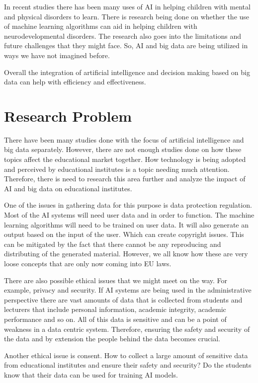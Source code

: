 \documentclass{imc-inf}
\begin{document}
In recent studies there has been many uses of AI in helping children with mental and physical disorders to learn. There is research being done on whether the use of machine learning algorithms can aid in helping children with neurodevelopmental disorders. The research also goes into the limitations and future challenges that they might face. So, AI and big data are being utilized in ways we have not imagined before. 

Overall the integration of artificial intelligence and decision making based on big data can help with efficiency and effectiveness. 

\section{Research Problem }
There have been many studies done with the focus of artificial intelligence and big data separately. However, there are not enough studies done on how these topics affect the educational market together. How technology is being adopted and perceived by educational institutes is a topic needing much attention. Therefore, there is need to research this area further and analyze the impact of AI and big data on educational institutes. 

One of the issues in gathering data for this purpose is data protection regulation. Most of the AI systems will need user data and in order to function. The machine learning algorithms will need to be trained on user data. It will also generate an output based on the input of the user. Which can create copyright issues. This can be mitigated by the fact that there cannot be any reproducing and distributing of the generated material. However, we all know how these are very loose concepts that are only now coming into EU laws. 

There are also possible ethical issues that we might meet on the way. For example, privacy and security. If AI systems are being used in the administrative perspective there are vast amounts of data that is collected from students and lecturers that include personal information, academic integrity, academic performance and so on. All of this data is sensitive and can be a point of weakness in a data centric system. Therefore, ensuring the safety and security of the data and by extension the people behind the data becomes crucial. 

Another ethical issue is consent. How to collect a large amount of sensitive data from educational institutes and ensure their safety and security? Do the students know that their data can be used for training AI models. 
\end{document}
